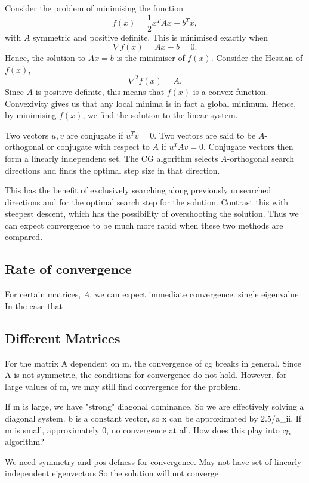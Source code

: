 Consider the problem of minimising the function
\[
    f(x) = \frac{1}{2} x^T A x - b^T x,
\]
with $A$ symmetric and positive definite. This is minimised exactly when 
\[
    \nabla f(x) = A x - b = 0.
\]
Hence, the solution to $Ax=b$ is the minimiser of $f(x)$.
Consider the Hessian of $f(x)$,
\[
    \nabla^2 f(x) = A.
\]
Since $A$ is positive definite, this means that $f(x)$ is a convex function.
Convexivity gives us that any local minima is in fact a global minimum.
Hence, by minimising $f(x)$, we find the solution to the linear system.

Two vectors $u, v$ are conjugate if $u^T v = 0$. 
Two vectors are said to be $A$-orthogonal or conjugate with respect to $A$ if $u^T A v = 0$.
Conjugate vectors then form a linearly independent set.
The CG algorithm selects $A$-orthogonal search directions and finds the optimal step size in that direction.

This has the benefit of exclusively searching along previously unsearched directions and for the optimal search step for the solution.
Contrast this with steepest descent, which has the possibility of overshooting the solution.
Thus we can expect convergence to be much more rapid when these two methods are compared.


\subsection{Rate of convergence}

For certain matrices, $A$, we can expect immediate convergence. single eigenvalue
In the case that 


\subsection{Different Matrices}

\iffalse

For the matrix A dependent on m, the convergence of cg breaks in general.
Since A is not symmetric, the conditions for convergence do not hold.
However, for large values of m, we may still find convergence for the problem.

If m is large, we have "strong" diagonal dominance. 
So we are effectively solving a diagonal system.
b is a constant vector, so x can be approximated by 2.5/a_{ii}.
If m is small, approximately 0, no convergence at all.
How does this play into cg algorithm?

We need symmetry and pos defness for convergence.
May not have set of linearly independent eigenvectors
So the solution will not converge


